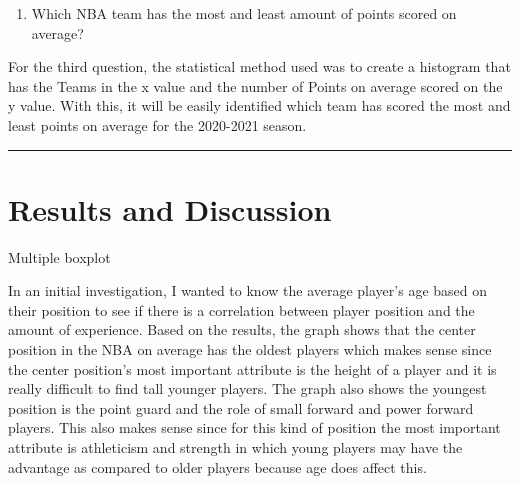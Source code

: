 \documentclass[
]{article}
\providecommand{\tightlist}{%
  \setlength{\itemsep}{0pt}\setlength{\parskip}{0pt}}
\begin{document}
\begin{enumerate}
\def\labelenumi{\arabic{enumi}.}
\setcounter{enumi}{2}
\tightlist
\item
  Which NBA team has the most and least amount of points scored on
  average?
\end{enumerate}

For the third question, the statistical method used was to create a
histogram that has the Teams in the x value and the number of Points on
average scored on the y value. With this, it will be easily identified
which team has scored the most and least points on average for the
2020-2021 season.

\vspace{.2in}
\hrule
\vspace{.2in}

\hypertarget{results-and-discussion}{%
\section{Results and Discussion}\label{results-and-discussion}}

Multiple boxplot

In an initial investigation, I wanted to know the average player's age
based on their position to see if there is a correlation between player
position and the amount of experience. Based on the results, the graph
shows that the center position in the NBA on average has the oldest
players which makes sense since the center position's most important
attribute is the height of a player and it is really difficult to find
tall younger players. The graph also shows the youngest position is the
point guard and the role of small forward and power forward players.
This also makes sense since for this kind of position the most important
attribute is athleticism and strength in which young players may have
the advantage as compared to older players because age does affect this.
\end{document}
